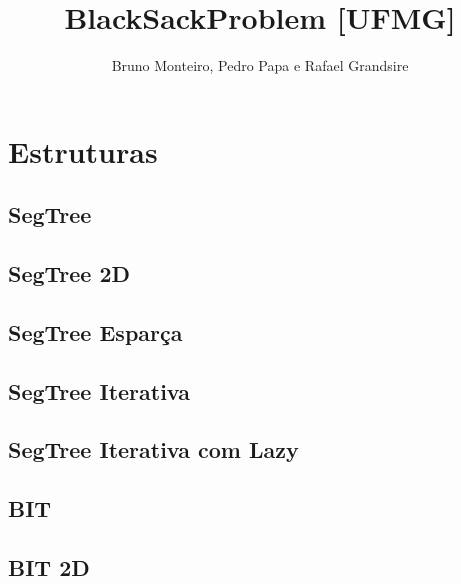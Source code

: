 \documentclass[12pt, a4paper, twoside]{article}
\title{BlackSackProblem [UFMG]}
\author{Bruno Monteiro, Pedro Papa e Rafael Grandsire}
\begin{document}
\twocolumn
\date{} %
\maketitle


\renewcommand{\contentsname}{Índice} %
\tableofcontents





%
%

\section{Estruturas}

\subsection{SegTree}


\subsection{SegTree 2D}


\subsection{SegTree Esparça}


\subsection{SegTree Iterativa}


\subsection{SegTree Iterativa com Lazy}


\subsection{BIT}


\subsection{BIT 2D}

\end{document}
